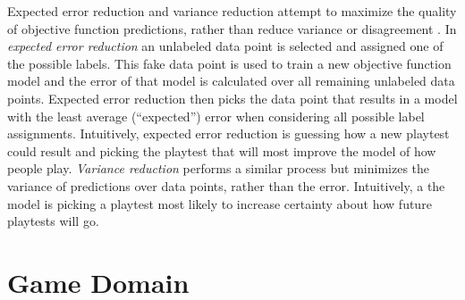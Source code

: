 \documentclass{sig-alternate}
\begin{document}
Expected error reduction and variance reduction attempt to maximize the quality of objective function predictions, rather than reduce variance or disagreement \cite{settles2012:al-book}.
In \textit{expected error reduction} an unlabeled data point is selected and assigned one of the possible labels.
This fake data point is used to train a new objective function model and the error of that model is calculated over all remaining unlabeled data points.
Expected error reduction then picks the data point that results in a model with the least average (``expected'') error when considering all possible label assignments.
Intuitively, expected error reduction is guessing how a new playtest could result and picking the playtest that will most improve the model of how people play.
\textit{Variance reduction} performs a similar process but minimizes the variance of predictions over data points, rather than the error.
Intuitively, a the model is picking a playtest most likely to increase certainty about how future playtests will go.







\section{Game Domain}
\end{document}
